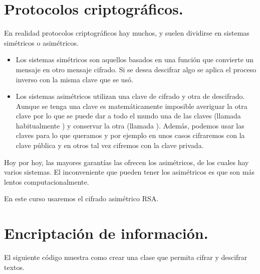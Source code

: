 \documentclass[letterpaper,10pt,spanish]{sphinxmanual}
\begin{document}
\section{Protocolos criptográficos.}
\label{\detokenize{textos/tema5:protocolos-criptograficos}}
En realidad protocolos criptográficos hay muchos, y suelen dividirse en sistemas simétricos o asimétricos.
\begin{itemize}
\item {} 
Los sistemas simétricos son aquellos basados en una función que convierte un mensaje en otro mensaje cifrado. Si se desea descifrar algo se aplica el proceso inverso con la misma clave que se usó.

\item {} 
Los sistemas asimétricos utilizan una clave de cifrado y otra de descifrado. Aunque se tenga una clave es matemáticamente imposible averiguar la otra clave por lo que se puede dar a todo el mundo una de las claves (llamada habitualmente ) y conservar la otra (llamada ). Además, podemos usar las claves para lo que queramos y por ejemplo en unos casos cifraremos con la clave pública y en otros tal vez cifremos con la clave privada.

\end{itemize}

Hoy por hoy, las mayores garantías las ofrecen los asimétricos, de los cuales hay varios sistemas. El inconveniente que pueden tener los asimétricos es que son más lentos computacionalmente.

En este curso usaremos el cifrado asimétrico RSA.


\section{Encriptación de información.}
\label{\detokenize{textos/tema5:encriptacion-de-informacion}}
El siguiente código muestra como crear una clase que permita cifrar y descifrar textos.
\end{document}

